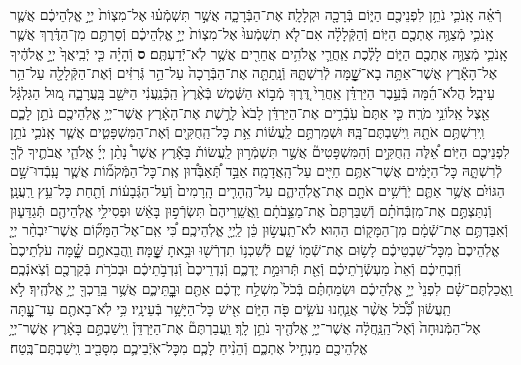 \documentclass[twoside, openany, parskip=half, 11pt]{book}
\begin{document}
\begin{footnotesize}
\begin{multicols}{2}
\\
רְֿאֵ֗ה אָֽנֹכִ֛י נֹתֵ֥ן לִפְנֵיכֶ֖ם הַיּ֑וֹם בְּֿרָכָ֖ה וּקְלָלָֽה׃ אֶת־הַבְּֿרָכָ֑ה אֲשֶׁ֣ר תִּשְׁמְֿע֗וּ אֶל־מִצְוֹת֙ יְיָ֣ אֱלֹֽהֵיכֶ֔ם אֲשֶׁ֧ר אָֽנֹכִ֛י מְֿצַוֶּ֥ה אֶתְכֶ֖ם הַיּֽוֹם׃ וְֿהַקְּֿלָלָ֗ה אִם־לֹ֤א תִשְׁמְֿעוּ֙ אֶל־מִצְוֹת֙ יְיָ֣ אֱלֹֽהֵיכֶ֔ם וְֿסַרְתֶּ֣ם מִן־הַדֶּ֔רֶךְ אֲשֶׁ֧ר אָֽנֹכִ֛י מְֿצַוֶּ֥ה אֶתְכֶ֖ם הַיּ֑וֹם לָלֶ֗כֶת אַֽחֲרֵ֛י אֱלֹהִ֥ים אֲחֵרִ֖ים אֲשֶׁ֥ר לֹֽא־יְֿֿדַעְתֶּֽם׃ \textbf{ס} וְֿהָיָ֗ה כִּ֤י יְֿבִֽיאֲךָ֙ יְיָ֣ אֱלֹהֶ֔יךָ אֶל־הָאָ֕רֶץ אֲשֶׁר־אַתָּ֥ה בָא־שׇׇׇׇׇׇָׁ֖מָּה לְֿרִשְׁתָּ֑הּ וְֿנָֽתַתָּ֤ה אֶת־הַבְּֿרָכָה֙ עַל־הַ֣ר גְּֿרִזִּ֔ים וְֿאֶת־הַקְּֿלָלָ֖ה עַל־הַ֥ר עֵיבָֽל׃ הֲלֹא־הֵ֜מָּה בְּֿעֵ֣בֶר הַיַּרְדֵּ֗ן אַֽחֲרֵי֙ דֶּ֚רֶךְ מְֿב֣וֹא הַשֶּׁ֔מֶשׁ בְּֿאֶ֨רֶץ֙ הַֽכְּֿנַֽעֲנִ֔י הַיּשֵׁ֖ב בָּֽעֲרָבָ֑ה מ֚וּל הַגִּלְגָּ֔ל אֵ֖צֶל אֵֽלוֹנֵ֥י מֹרֶֽה׃ כִּ֤י אַתֶּם֙ עֹֽבְֿרִ֣ים אֶת־הַיַּרְדֵּ֔ן לָבֹא֙ לָרֶ֣שֶׁת אֶת־הָאָ֔רֶץ אֲשֶׁר־יְיָ֥ אֱלֹֽהֵיכֶ֖ם נֹתֵ֣ן לָכֶ֑ם וִֽירִשְׁתֶּ֥ם אֹתָ֖הּ וִֽישַׁבְתֶּם־בָּֽהּ׃
וּשְׁמַרְתֶּ֣ם לַֽעֲשׂ֔וֹת אֵ֥ת כׇּל־הַֽחֻקִּ֖ים וְֿאֶת־הַמִּשְׁפָּטִ֑ים אֲשֶׁ֧ר אָֽנֹכִ֛י נֹתֵ֥ן לִפְנֵיכֶ֖ם הַיּֽוֹם׃
אֵ֠לֶּה הַֽחֻקִּ֣ים וְֿהַמִּשְׁפָּטִים֘ אֲשֶׁ֣ר תִּשְׁמְֿר֣וּן לַֽעֲשׂוֹת֒ בָּאָ֕רֶץ אֲשֶׁר֩ נָתַ֨ן יְיָ֜ אֱלֹהֵ֧י אֲבֹתֶ֛יךָ לְֿךָ֖ לְֿרִשְׁתָּ֑הּ כׇּל־הַיָּמִ֔ים אֲשֶׁר־אַתֶּ֥ם חַיִּ֖ים עַל־הָֽאֲדָמָֽה׃ אַבֵּ֣ד תְּֿ֠אַבְּֿד֠וּן אֶֽת־כׇּל־הַמְּֿקֹמ֞וֹת אֲשֶׁ֧ר עָֽבְֿדוּ־שָׁ֣ם הַגּוֹיִ֗ם אֲשֶׁ֥ר אַתֶּ֛ם יֹֽרְֿשִׁ֥ים אֹתָ֖ם אֶת־אֱלֹֽהֵיהֶ֑ם עַל־הֶֽהָרִ֤ים הָֽרָמִים֙ וְֿעַל־הַגְּֿבָע֔וֹת וְֿתַ֖חַת כׇּל־עֵ֥ץ רַֽעֲנָֽן׃ וְֿנִתַּצְתֶּ֣ם אֶת־מִזְבְּֿחֹתָ֗ם וְֿשִׁבַּרְתֶּם֙ אֶת־מַצֵּ֣בֹתָ֔ם וַֽאֲשֵֽׁרֵיהֶם֙ תִּשְׂרְֿפ֣וּן בָּאֵ֔שׁ וּפְסִילֵ֥י אֱלֹֽהֵיהֶ֖ם תְּֿגַדֵּע֑וּן וְֿאִבַּדְתֶּ֣ם אֶת־שְֿׁמָ֔ם מִן־הַמָּק֖וֹם הַהֽוּא׃ לֹא־תַֽעֲשׂ֣וּן כֵּ֔ן לַֽיְיָ֖ אֱלֹֽהֵיכֶֽם׃ כִּ֠י אִֽם־אֶל־הַמָּק֞וֹם אֲשֶׁר־יִבְחַ֨ר יְיָ֤ אֱלֹֽהֵיכֶם֙ מִכׇּל־שִׁבְטֵיכֶ֔ם לָשׂ֥וּם אֶת־שְֿׁמ֖וֹ שָׁ֑ם לְֿשִׁכְנ֥וֹ תִדְרְֿשׁ֖וּ וּבָ֥אתָ שׇׇׇׇׇׇׇׇָּֽׁמָּה׃  וַֽהֲבֵאתֶ֣ם שׇׇׇׇׇׇָׁ֗מָּה עֹלֹֽתֵיכֶם֙ וְֿזִבְחֵיכֶ֔ם וְֿאֵת֙ מַעְשְֿׂרֹ֣תֵיכֶ֔ם וְֿאֵ֖ת תְּֿרוּמַ֣ת יֶדְכֶ֑ם וְֿנִדְרֵיכֶם֙ וְֿנִדְבֹ֣תֵיכֶ֔ם וּבְכֹרֹ֥ת בְּֿקַרְכֶ֖ם וְֿצֹֽאנְֿכֶֽם׃ וַֽאֲכַלְתֶּם־שָׁ֗ם לִפְנֵי֙ יְיָ֣ אֱלֹֽהֵיכֶ֔ם וּשְׂמַחְתֶּ֗ם בְּֿכֹל֙ מִשְׁלַ֣ח יֶדְכֶ֔ם אַתֶּ֖ם וּבׇׇׇׇׇׇׇׇׇׇׇׇׇׇָֽתֵּיכֶ֑ם אֲשֶׁ֥ר בֵּֽרַכְךָ֖ יְיָ֥ אֱלֹהֶֽיךָ׃ לֹ֣א תַֽעֲשׂ֔וּן כְּֿ֠כֹ֠ל אֲשֶׁ֨ר אֲנַ֧חְנוּ עֹשִׂ֛ים פֹּ֖ה הַיּ֑וֹם אִ֖ישׁ כׇּל־הַיָּשָׁ֥ר בְּֿעֵינָֽיו׃ כִּ֥י לֹֽא־בָאתֶ֖ם עַד־עׇׇׇׇׇׇָ֑תָּה אֶל־הַמְּֿנוּחָה֙ וְֿאֶל־הַֽנַּֽחֲלָ֔ה אֲשֶׁר־יְיָ֥ אֱלֹהֶ֖יךָ נֹתֵ֥ן לָֽךְ׃ וַֽעֲבַרְתֶּם֘ אֶת־הַיַּרְדֵּן֒ וִֽישַׁבְתֶּ֣ם בָּאָ֔רֶץ אֲשֶׁר־יְיָ֥ אֱלֹֽהֵיכֶ֖ם מַנְחִ֣יל אֶתְכֶ֑ם וְֿהֵנִ֨יחַ לָכֶ֧ם מִכׇּל־אֹֽיְֿבֵיכֶ֛ם מִסָּבִ֖יב וִֽישַׁבְתֶּם־בֶּֽטַח׃


\end{multicols}
\end{footnotesize}
\end{document}
